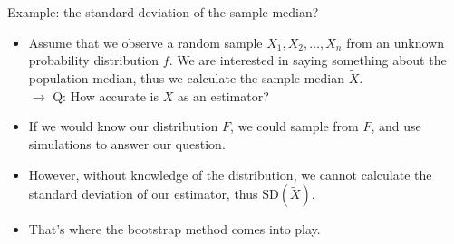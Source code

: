 \documentclass[
  10pt,
  ignorenonframetext,
]{beamer}
\providecommand{\tightlist}{%
  \setlength{\itemsep}{0pt}\setlength{\parskip}{0pt}}
\begin{document}
\begin{frame}
\begin{block}{Example: the standard deviation of the sample median?}
\protect\hypertarget{example-the-standard-deviation-of-the-sample-median}{}
\(~\)

\begin{itemize}
\tightlist
\item
  Assume that we observe a random sample \(X_1, X_2, \ldots, X_n\) from
  an unknown probability distribution \(f\). We are interested in saying
  something about the population median, thus we calculate the sample
  median \(\tilde{X}\).\\
  \(\rightarrow\) Q: How accurate is \(\tilde{X}\) as an estimator?
\end{itemize}

\vspace{2mm}

\begin{itemize}
\tightlist
\item
  If we would know our distribution \(F\), we could sample from \(F\),
  and use simulations to answer our question.
\end{itemize}

\vspace{2mm}

\begin{itemize}
\tightlist
\item
  However, without knowledge of the distribution, we cannot calculate
  the standard deviation of our estimator, thus
  \(\text{SD}(\tilde{X})\).
\end{itemize}

\vspace{2mm}

\begin{itemize}
\tightlist
\item
  That's where the bootstrap method comes into play.
\end{itemize}
\end{block}
\end{frame}
\end{document}
